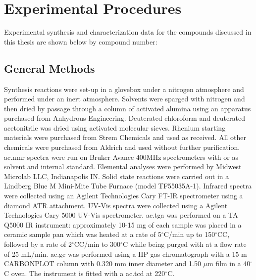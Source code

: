 \chapter{Experimental Procedures}\label{chap.exp}

Experimental synthesis and characterization data for the compounds discussed in this thesis are shown below by compound number:

\section{General Methods}\label{sec:.genmethods}
Synthesis reactions were set-up in a glovebox under a nitrogen atmosphere and performed under an inert atmosphere. Solvents were sparged with nitrogen and then dried by passage through a column of activated alumina using an apparatus purchased from Anhydrous Engineering. Deuterated chloroform and deuterated acetonitrile was dried using activated molecular sieves. Rhenium starting materials were purchased from Strem Chemicals and used as received. All other chemicals were purchased from Aldrich and used without further purification. \Gls{ac.nmr} spectra were run on Bruker Avance 400MHz spectrometers with  or  as solvent and internal standard. Elemental analyses were performed by Midwest Microlab LLC, Indianapolis IN. Solid state reactions were carried out in a Lindberg Blue M Mini-Mite Tube Furnace (model TF55035A-1). Infrared spectra were collected using an Agilent Technologies Cary FT-IR spectrometer using a diamond ATR attachment. UV-Vis spectra were collected using a Agilent Technologies Cary 5000 UV-Vis spectrometer. \Gls{ac.tga} was performed on a TA Q5000 IR instrument: approximately 10-15 mg of each sample was placed in a ceramic sample pan which was heated at a rate of 5$^\circ$C/min up to 150$^\circ$CC, followed by a rate of 2$^\circ$CC/min to 300$^\circ$C while being purged with  at a flow rate of 25 mL/min. \Gls{ac.gc} was performed using a HP gas chromatograph with a 15 m CARBONPLOT column with 0.320 mm inner diameter and 1.50 $\mu$m film in a 40$^\circ$C oven. The instrument is fitted with a \gls{ac.tcd} at 220$^\circ$C.

